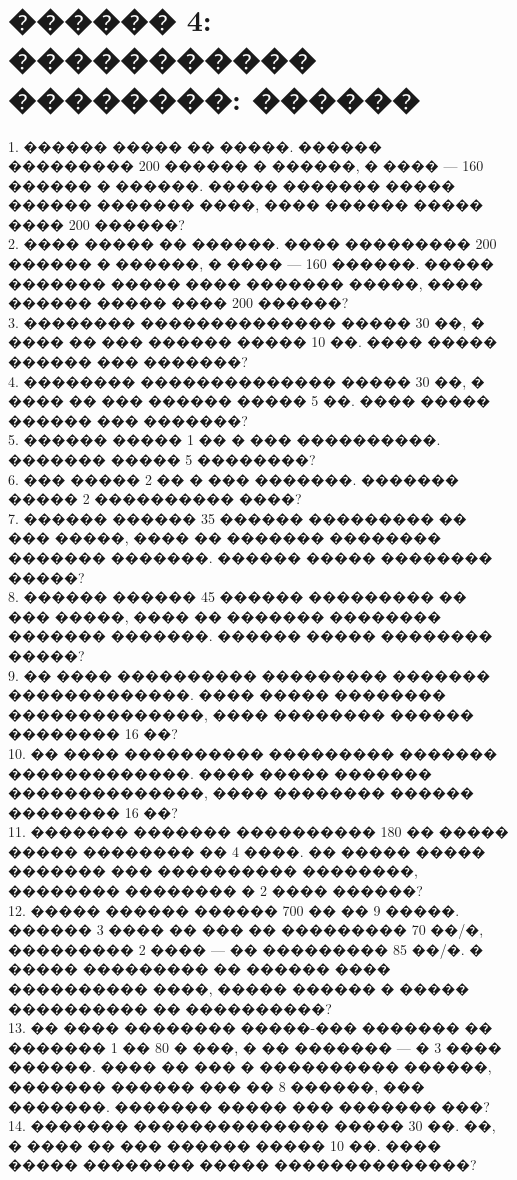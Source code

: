 \documentclass[12pt]{article}
\begin{document}
\section{������ 4: ����������� ��������: ������}
1. ������ ����� �� �����. ������ ��������� 200 ������ � ������, � ���� --- 160 ������ � ������. ����� ������� ����� ������ ������� ����, ���� ������ ����� ���� 200 ������?\\
2. ���� ����� �� ������. ���� ��������� 200 ������ � ������, � ���� --- 160 ������. ����� ������� ����� ���� ������� �����, ���� ������ ����� ���� 200 ������?\\
3. �������� �������������� ����� 30 ��, � ���� �� ��� ������ ����� 10 ��. ���� ����� ������ ��� �������?\\
4. �������� �������������� ����� 30 ��, � ���� �� ��� ������ ����� 5 ��. ���� ����� ������ ��� �������?\\
5. ������ ����� 1 �� � ��� ����������. ������� ����� 5 ��������?\\
6. ��� ����� 2 �� � ��� �������. ������� ����� 2 ���������� ����?\\
7. ������ ������ 35 ������ ��������� �� ��� �����, ���� �� ������� �������� ������� �������. ������ ����� �������� �����?\\
8. ������ ������ 45 ������ ��������� �� ��� �����, ���� �� ������� �������� ������� �������. ������ ����� �������� �����?\\
9. �� ���� ���������� ��������� ������� �������������. ���� ����� �������� ��������������, ���� �������� ������ �������� 16 ��?\\
10. �� ���� ���������� ��������� ������� �������������. ���� ����� ������� ��������������, ���� �������� ������ �������� 16 ��?\\
11. ������� ������� ���������� 180 �� ����� ����� �������� �� 4 ����. �� ����� ����� ������� ��� ���������� ��������, �������� �������� � 2 ���� ������?\\
12. ����� ������ ������ 700 �� �� 9 �����. ������ 3 ���� �� ��� �� ��������� 70 ��/�, ��������� 2 ���� --- �� ��������� 85 ��/�. � ����� ��������� �� ������ ���� ���������� ����, ����� ������ � ����� ���������� �� ����������?\\
13. �� ���� �������� �����-��� ������� �� ������� 1 �� 80 � ���, � �� ������� --- � 3 ���� ������. ���� �� ��� � ���������� ������, ������� ������ ��� �� 8 ������, ��� �������. ������� ����� ��� ������� ���?\\
14. ������� �������������� ����� 30 ��. ��, � ���� �� ��� ������ ����� 10 ��. ���� ����� �������� ����� ��������������?\\
\end{document}
